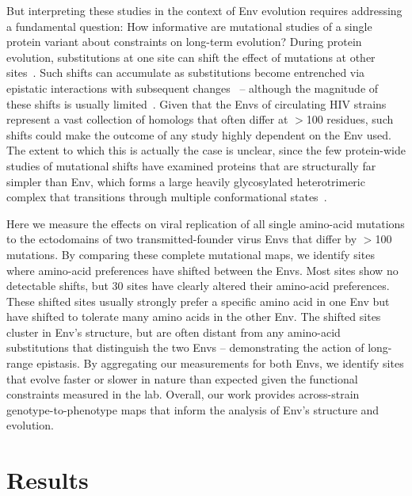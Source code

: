 \documentclass[9pt]{elife}
\begin{document}
But interpreting these studies in the context of Env evolution requires addressing a fundamental question: How informative are mutational studies of a single protein variant about constraints on long-term evolution?
During protein evolution, substitutions at one site can shift the effect of mutations at other sites~\citep{natarajan2013epistasis,gong2013stability,harms2014historical,podgornaia2015pervasive,starr2016epistasis}.
Such shifts can accumulate as substitutions become entrenched via epistatic interactions with subsequent changes~\citep{starr2017pervasive,pollock2012amino,shah2015contingency} -- although the magnitude of these shifts is usually limited~\citep{doud2015site,chan2017correlation,ashenberg2013mutational,risso2014mutational}.
Given that the Envs of circulating HIV strains represent a vast collection of homologs that often differ at $>$100 residues, such shifts could make the outcome of any study highly dependent on the Env used.
The extent to which this is actually the case is unclear, since the few protein-wide studies of mutational shifts have examined proteins that are structurally far simpler than Env, which forms a large heavily glycosylated heterotrimeric complex that transitions through multiple conformational states~\citep{munro2014conformational,ozorowski2017open}.

Here we measure the effects on viral replication of all single amino-acid mutations to the ectodomains of two transmitted-founder virus Envs that differ by $>$100 mutations.
By comparing these complete mutational maps, we identify sites where amino-acid preferences have shifted between the Envs.
Most sites show no detectable shifts, but 30 sites have clearly altered their amino-acid preferences.
These shifted sites usually strongly prefer a specific amino acid in one Env but have shifted to tolerate many amino acids in the other Env.
The shifted sites cluster in Env's structure, but are often distant from any amino-acid substitutions that distinguish the two Envs -- demonstrating the action of long-range epistasis.
By aggregating our measurements for both Envs, we identify sites that evolve faster or slower in nature than expected given the functional constraints measured in the lab.
Overall, our work provides across-strain genotype-to-phenotype maps that inform the analysis of Env's structure and evolution.

\section{Results}
\end{document}
